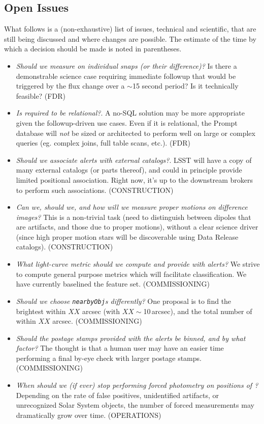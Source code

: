 \begin{openissues}
\subsection{Open Issues}

What follows is a (non-exhaustive) list of issues, technical and scientific, that are still being discussed and where changes are possible. The estimate of the time by which a decision should be made is noted in parentheses.

\begin{itemize}
    \item \emph{Should we measure on individual snaps (or their difference)?} Is there a demonstrable science case requiring immediate followup that would be triggered by the flux change over a $\sim$15 second period? Is it technically feasible? (FDR)
    \item \emph{Is \PPDB required to be relational?}. A no-SQL solution may be more appropriate given the followup-driven use cases. Even if it is relational, the Prompt database will \emph{not} be sized or architected to perform well on large or complex queries (eg. complex joins, full table scans, etc.). (FDR)
    \item \emph{Should we associate alerts with external catalogs?}. LSST will have a copy of many external catalogs (or parts thereof), and could in principle provide limited positional association. Right now, it's up to the downstream brokers to perform such associations. (CONSTRUCTION)
    \item \emph{Can we, should we, and how will we measure proper motions on difference images?} This is a non-trivial task (need to distinguish between dipoles that are artifacts, and those due to proper motions), without a clear science driver (since high proper motion stars will be discoverable using Data Release catalogs). (CONSTRUCTION)
    \item \emph{What light-curve metric should we compute and provide with alerts?} We strive to compute general purpose metrics which will facilitate classification. We have currently baselined the \citet{2011ApJ...733...10R} feature set. (COMMISSIONING)
    \item \emph{Should we choose \texttt{nearbyObj}s differently?} One proposal is to find the brightest \Object within $XX$ arcsec (with $XX \sim$10\,arcsec), and the total number of \Objects within $XX$ arcsec. (COMMISSIONING)
    \item \emph{Should the postage stamps provided with the alerts be binned, and by what factor?} The thought is that a human user may have an easier time performing a final by-eye check with larger postage stamps. (COMMISSIONING)
    \item \emph{When should we (if ever) stop performing forced photometry on positions of \DIAObjects?} Depending on the rate of false positives, unidentified artifacts, or unrecognized Solar System objects, the number of forced measurements may dramatically grow over time. (OPERATIONS)

\end{itemize}
\end{openissues}

